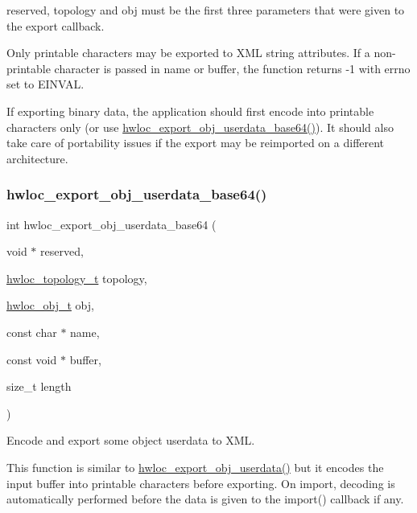 {\ttfamily reserved}, {\ttfamily topology} and {\ttfamily obj} must be the first three parameters that were given to the export callback.

Only printable characters may be exported to X\+ML string attributes. If a non-\/printable character is passed in {\ttfamily name} or {\ttfamily buffer}, the function returns -\/1 with errno set to E\+I\+N\+V\+AL.

If exporting binary data, the application should first encode into printable characters only (or use \hyperlink{a00206_ga1b7358137cec27bd073f58a606ecbaba}{hwloc\+\_\+export\+\_\+obj\+\_\+userdata\+\_\+base64()}). It should also take care of portability issues if the export may be reimported on a different architecture. \mbox{\label{a00206_ga1b7358137cec27bd073f58a606ecbaba}} 
\subsubsection{\texorpdfstring{hwloc\+\_\+export\+\_\+obj\+\_\+userdata\+\_\+base64()}{hwloc\_export\_obj\_userdata\_base64()}}
{\footnotesize\ttfamily int hwloc\+\_\+export\+\_\+obj\+\_\+userdata\+\_\+base64 (\begin{DoxyParamCaption}\item[{void $\ast$}]{reserved,  }\item[{\hyperlink{a00186_ga9d1e76ee15a7dee158b786c30b6a6e38}{hwloc\+\_\+topology\+\_\+t}}]{topology,  }\item[{\hyperlink{a00185_ga79b8ab56877ef99ac59b833203391c7d}{hwloc\+\_\+obj\+\_\+t}}]{obj,  }\item[{const char $\ast$}]{name,  }\item[{const void $\ast$}]{buffer,  }\item[{size\+\_\+t}]{length }\end{DoxyParamCaption})}



Encode and export some object userdata to X\+ML. 

This function is similar to \hyperlink{a00206_gaa541bdd628416dbbe97d0df69d3de958}{hwloc\+\_\+export\+\_\+obj\+\_\+userdata()} but it encodes the input buffer into printable characters before exporting. On import, decoding is automatically performed before the data is given to the import() callback if any.

